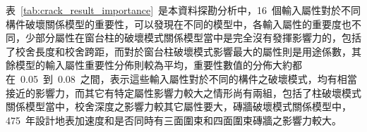 
表~\ref{tab:crack_result_importance}~是本資料探勘分析中，16~個輸入屬性對於不同構件破壞關係模型的重要性，可以發現在不同的模型中，各輸入屬性的重要度也不同，少部分屬性在窗台柱的破壞模式關係模型當中是完全沒有發揮影響力的，包括了校舍長度和校舍跨距，而對於窗台柱破壞模式影響最大的屬性則是用途係數，其餘模型的輸入屬性重要性分佈則較為平均，重要性數值的分佈大約都在~0.05~到~0.08~之間，表示這些輸入屬性對於不同的構件之破壞模式，均有相當接近的影響力，而其它有特定屬性影響力較大之情形尚有兩組，包括了柱破壞模式關係模型當中，校舍深度之影響力較其它屬性要大，磚牆破壞模式關係模型中，475~年設計地表加速度和是否同時有三面圍束和四面圍束磚牆之影響力較大。


